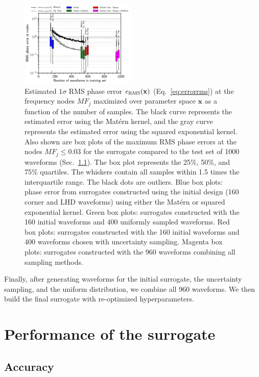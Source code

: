 \documentclass[prd,aps,letter,twocolumn,floatfix,notitlepage,nofootinbib]{revtex4-1}
\def\bx{\mathbf{x}}
\begin{document}
\begin{figure}[htb]
\centering
\includegraphics[width=0.49\textwidth]{uncertaintysampling.pdf}
\caption{Estimated $1\sigma$ RMS phase error $\epsilon_{\rm RMS}(\bx)$ (Eq.~\eqref{eq:errorrms}) at the frequency nodes $MF_j$ maximized over parameter space $\bx$ as a function of the number of samples. The black curve represents the estimated error using the Mat\'{e}rn kernel, and the gray curve represents the estimated error using the squared exponential kernel. Also shown are box plots of the maximum RMS phase errors at the nodes $MF_j \le 0.03$ for the surrogate compared to the test set of 1000 waveforms (Sec.~\ref{sec:accuracy}). The box plot represents the 25\%, 50\%, and 75\% quartiles. The whiskers contain all samples within 1.5 times the interquartile range. The black dots are outliers. Blue box plots: phase error from surrogates constructed using the initial design (160 corner and LHD waveforms) using either the Mat\'{e}rn or squared exponential kernel. Green box plots: surrogates constructed with the 160 initial waveforms and 400 uniformly sampled waveforms. Red box plots: surrogates constructed with the 160 initial waveforms and 400 waveforms chosen with uncertainty sampling. Magenta box plots: surrogates constructed with the 960 waveforms combining all sampling methods.}
\label{fig:uncsamp}
\end{figure}

Finally, after generating waveforms for the initial surrogate, the uncertainty sampling, and the uniform distribution, we combine all 960 waveforms. We then build the final surrogate with re-optimized hyperparameters.



\section{Performance of the surrogate}
\label{sec:performance}

\subsection{Accuracy}
\label{sec:accuracy}
\end{document}
